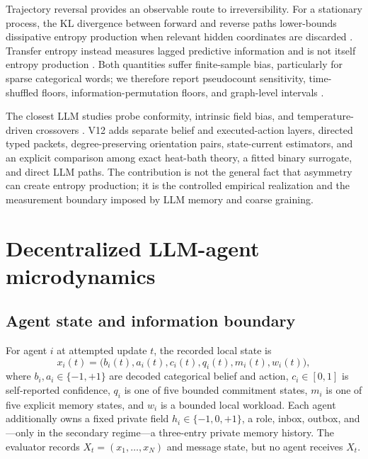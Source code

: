 \documentclass[12pt]{article}
\begin{document}
Trajectory reversal provides an observable route to irreversibility.
For a stationary process, the KL divergence between forward and reverse paths
lower-bounds dissipative entropy production when relevant hidden coordinates are
discarded \cite{roldan2012,kawaguchi2013}. Transfer entropy instead measures
lagged predictive information and is not itself entropy production
\cite{schreiber2000}. Both quantities suffer finite-sample bias, particularly
for sparse categorical words; we therefore report pseudocount sensitivity,
time-shuffled floors, information-permutation floors, and graph-level intervals
\cite{paninski2003}.

The closest LLM studies probe conformity, intrinsic field bias, and
temperature-driven crossovers \cite{han2026,denobili2026,okawa2026}. V12 adds
separate belief and executed-action layers, directed typed packets,
degree-preserving orientation pairs, state-current estimators, and an explicit
comparison among exact heat-bath theory, a fitted binary surrogate, and direct
LLM paths. The contribution is not the general fact that asymmetry can create
entropy production; it is the controlled empirical realization and the
measurement boundary imposed by LLM memory and coarse graining.

\section{Decentralized LLM-agent microdynamics}

\subsection{Agent state and information boundary}

For agent $i$ at attempted update $t$, the recorded local state is
\begin{equation}
 x_i(t)=\bigl(b_i(t),a_i(t),c_i(t),q_i(t),m_i(t),w_i(t)\bigr),
 \label{eq:localstate}
\end{equation}
where $b_i,a_i\in\{-1,+1\}$ are decoded categorical belief and action,
$c_i\in[0,1]$ is self-reported confidence, $q_i$ is one of five bounded
commitment states, $m_i$ is one of five explicit memory states, and $w_i$ is a
bounded local workload. Each agent additionally owns a fixed private field
$h_i\in\{-1,0,+1\}$, a role, inbox, outbox, and---only in the secondary
regime---a three-entry private memory history. The evaluator records
$X_t=(x_1,\ldots,x_N)$ and message state, but no agent receives $X_t$.
\end{document}
